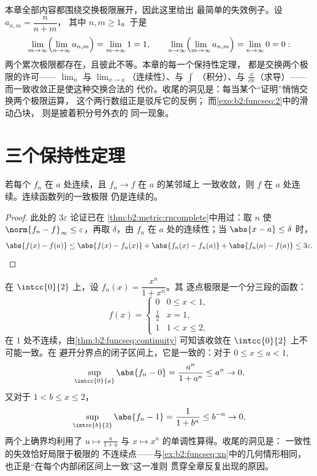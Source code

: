 \begin{example}[两个不可交换的极限]\label{ex:b2:funcseq:doublelimit}
本章全部内容都围绕交换极限展开，因此这里给出
最简单的失效例子。设 $a_{n,m} = \dfrac{n}{n+m}$，
其中 $n, m \geq 1$。于是
\[
\lim_{m\to\infty}\Bigl(\lim_{n\to\infty}a_{n,m}\Bigr)
= \lim_{m\to\infty} 1 = 1,
\qquad
\lim_{n\to\infty}\Bigl(\lim_{m\to\infty}a_{n,m}\Bigr)
= \lim_{n\to\infty} 0 = 0 :
\]
两个累次极限都存在，且彼此不等。本章的每一个保持性定理，
都是交换两个极限的许可——
$\lim_n$ 与 $\lim_{x\to a}$（连续性）、与 $\int$
（积分）、与 $\frac{\dd}{\dd x}$（求导）——
而一致收敛正是使这种交换合法的
代价。收尾的洞见是：每当某个“证明”悄悄交换两个极限运算，
这个两行数组正是驳斥它的反例；
而\cref{exo:b2:funcseq:2}中的滑动凸块，
则是披着积分号外衣的
同一现象。
\end{example}

\section{三个保持性定理}

\begin{theorem}[连续性]\label{thm:b2:funcseq:continuity}
若每个 $f_n$ 在 $a$ 处连续，且 $f_n \to f$ 在 $a$ 的某邻域上
一致收敛，则 $f$ 在 $a$ 处连续。连续函数列的一致极限
仍是连续的。
\end{theorem}

\begin{proof}
此处的 $3\varepsilon$ 论证已在
\cref{thm:b2:metric:rncomplete}中用过：取 $n$ 使 $\norm{f_n -
f}_\infty \leq \varepsilon$，再取 $\delta$，由
$f_n$ 在 $a$ 处的连续性；当 $\abs{x - a} \leq \delta$ 时，
\[
\abs{f(x) - f(a)} \leq \abs{f(x) - f_n(x)} + \abs{f_n(x) - f_n(a)}
+ \abs{f_n(a) - f(a)} \leq 3\varepsilon . \qedhere
\]
\end{proof}

\begin{example}[一致性恰在极限断裂处失效]\label{ex:b2:funcseq:threshold}
在 $\intcc{0}{2}$ 上，设 $f_n(x) = \dfrac{x^n}{1 + x^n}$。其
逐点极限是一个分三段的函数：
\[
f(x) = \begin{cases} 0 & 0 \leq x < 1,\\[2pt]
\tfrac12 & x = 1,\\[2pt]
1 & 1 < x \leq 2, \end{cases}
\]
在 $1$ 处不连续，由\cref{thm:b2:funcseq:continuity}
可知该收敛在 $\intcc{0}{2}$ 上不可能一致。在
避开分界点的闭子区间上，它是一致的：对于 $0 \leq x \leq
a < 1$,
\[
\sup_{\intcc{0}{a}}\abs{f_n - 0}
= \frac{a^n}{1 + a^n} \leq a^n \to 0 ,
\]
又对于 $1 < b \leq x \leq 2$，
\[
\sup_{\intcc{b}{2}}\abs{f_n - 1}
= \frac{1}{1 + b^n} \leq b^{-n} \to 0 ,
\]
两个上确界均利用了 $u \mapsto
\frac{u}{1+u}$ 与 $x \mapsto x^n$ 的单调性算得。收尾的洞见是：
一致性的失效恰好局限于极限的
不连续点——与\cref{ex:b2:funcseq:xn}中的几何情形相同，
也正是“在每个内部闭区间上一致”这一准则
贯穿全章反复出现的原因。
\end{example}

